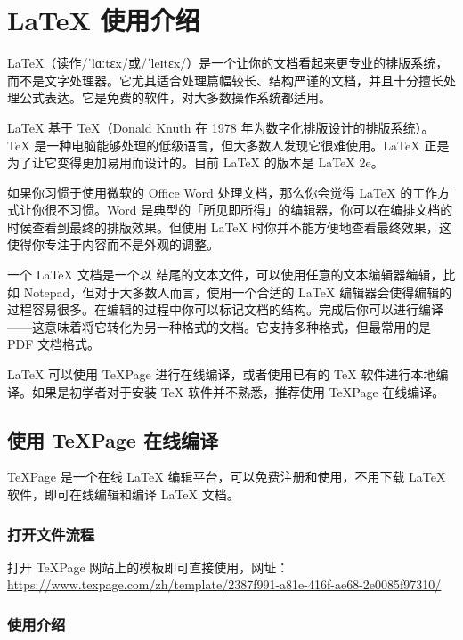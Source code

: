 
\chapter{\LaTeX{} 使用介绍}

LaTeX（读作/ˈlɑːtɛx/或/ˈleɪtɛx/）是一个让你的文档看起来更专业的排版系统，而不是文字处理器。它尤其适合处理篇幅较长、结构严谨的文档，并且十分擅长处理公式表达。它是免费的软件，对大多数操作系统都适用。

LaTeX 基于 TeX（Donald Knuth 在 1978 年为数字化排版设计的排版系统）。TeX 是一种电脑能够处理的低级语言，但大多数人发现它很难使用。LaTeX 正是为了让它变得更加易用而设计的。目前 LaTeX 的版本是 LaTeX 2e。

如果你习惯于使用微软的 Office Word 处理文档，那么你会觉得 LaTeX 的工作方式让你很不习惯。Word 是典型的「所见即所得」的编辑器，你可以在编排文档的时侯查看到最终的排版效果。但使用 LaTeX 时你并不能方便地查看最终效果，这使得你专注于内容而不是外观的调整。

一个 LaTeX 文档是一个以  结尾的文本文件，可以使用任意的文本编辑器编辑，比如 Notepad，但对于大多数人而言，使用一个合适的 LaTeX 编辑器会使得编辑的过程容易很多。在编辑的过程中你可以标记文档的结构。完成后你可以进行编译——这意味着将它转化为另一种格式的文档。它支持多种格式，但最常用的是 PDF 文档格式。

LaTeX 可以使用 TeXPage 进行在线编译，或者使用已有的 TeX 软件进行本地编译。如果是初学者对于安装 TeX 软件并不熟悉，推荐使用 TeXPage 在线编译。

\section{使用 TeXPage 在线编译}

TeXPage 是一个在线 LaTeX 编辑平台，可以免费注册和使用，不用下载 LaTeX 软件，即可在线编辑和编译 LaTeX 文档。

\subsection{打开文件流程}

打开 TeXPage 网站上的模板即可直接使用，网址：\url{https://www.texpage.com/zh/template/2387f991-a81e-416f-ae68-2e0085f97310/}

\subsection{使用介绍}

